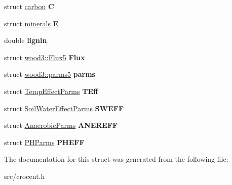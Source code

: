\begin{DoxyCompactItemize}
\item 
\hypertarget{structwood3_aa8874a0428400a0b857829c6212ec77b}{struct \hyperlink{structcarbon}{carbon} {\bfseries C}}\label{structwood3_aa8874a0428400a0b857829c6212ec77b}

\item 
\hypertarget{structwood3_a01f38d7696ecd33d0c7cfda1be179ac1}{struct \hyperlink{structminerals}{minerals} {\bfseries E}}\label{structwood3_a01f38d7696ecd33d0c7cfda1be179ac1}

\item 
\hypertarget{structwood3_aef6df00ee77c1ba26196a7e224e36edc}{double {\bfseries lignin}}\label{structwood3_aef6df00ee77c1ba26196a7e224e36edc}

\item 
\hypertarget{structwood3_af91bfc5e7df1123014c666141dc54e07}{struct \hyperlink{structwood3_1_1_flux5}{wood3\-::\-Flux5} {\bfseries Flux}}\label{structwood3_af91bfc5e7df1123014c666141dc54e07}

\item 
\hypertarget{structwood3_a5af32d6da65b1641469ad65118f245a2}{struct \hyperlink{structwood3_1_1parms5}{wood3\-::parms5} {\bfseries parms}}\label{structwood3_a5af32d6da65b1641469ad65118f245a2}

\item 
\hypertarget{structwood3_a9cc24805f9f8f08a953778d43038b638}{struct \hyperlink{struct_temp_effect_parms}{Temp\-Effect\-Parms} {\bfseries T\-Eff}}\label{structwood3_a9cc24805f9f8f08a953778d43038b638}

\item 
\hypertarget{structwood3_ab88f286d1fd142c9086dd62802e8b37b}{struct \hyperlink{struct_soil_water_effect_parms}{Soil\-Water\-Effect\-Parms} {\bfseries S\-W\-E\-F\-F}}\label{structwood3_ab88f286d1fd142c9086dd62802e8b37b}

\item 
\hypertarget{structwood3_a6ea74cdc8d482e1e343a0076a5dee19f}{struct \hyperlink{struct_anaerobic_parms}{Anaerobic\-Parms} {\bfseries A\-N\-E\-R\-E\-F\-F}}\label{structwood3_a6ea74cdc8d482e1e343a0076a5dee19f}

\item 
\hypertarget{structwood3_aaae1b9da746f5a462a44677abb893352}{struct \hyperlink{struct_p_h_parms}{P\-H\-Parms} {\bfseries P\-H\-E\-F\-F}}\label{structwood3_aaae1b9da746f5a462a44677abb893352}

\end{DoxyCompactItemize}


The documentation for this struct was generated from the following file\-:\begin{DoxyCompactItemize}
\item 
src/crocent.\-h\end{DoxyCompactItemize}

